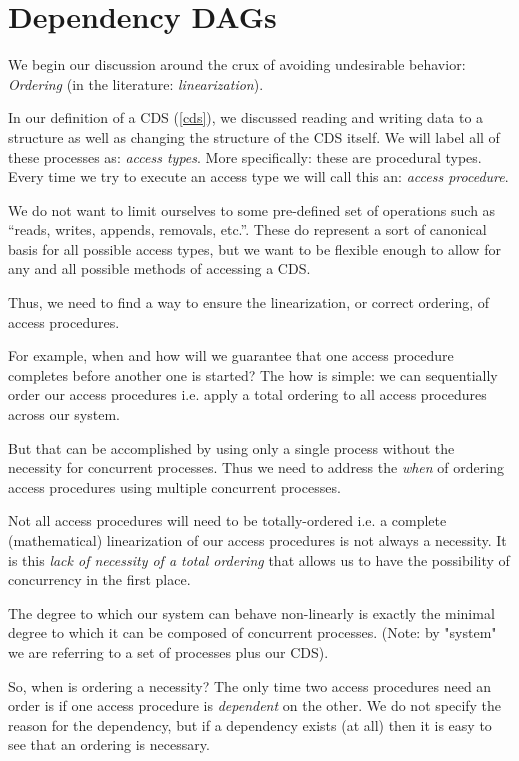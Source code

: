 \section{Dependency DAGs}

We begin our discussion around the crux of avoiding undesirable behavior: \textit{Ordering} (in the literature: \textit{linearization}).

In our definition of a CDS (\ref{cds}), we discussed reading and writing data to a structure as well as changing the structure of the CDS itself. We will label all of these processes as: \textit{access types}. More specifically: these are procedural types. Every time we try to execute an access type we will call this an: \textit{access procedure}.

We do not want to limit ourselves to some pre-defined set of operations such as ``reads, writes, appends, removals, etc.''. These do represent a sort of canonical basis for all possible access types, but we want to be flexible enough to allow for any and all possible methods of accessing a CDS.

Thus, we need to find a way to ensure the linearization, or correct ordering, of access procedures. 

For example, when and how will we guarantee that one access procedure completes before another one is started? The how is simple: we can sequentially order our access procedures i.e. apply a total ordering to all access procedures across our system. 

But that can be accomplished by using only a single process without the necessity for concurrent processes. Thus we need to address the \textit{when} of ordering access procedures using multiple concurrent processes.

Not all access procedures will need to be totally-ordered i.e. a complete (mathematical) linearization of our access procedures is not always a necessity. It is this \textit{lack of necessity of a total ordering} that allows us to have the possibility of concurrency in the first place. 

The degree to which our system can behave non-linearly is exactly the minimal degree to which it can be composed of concurrent processes. (Note: by "system" we are referring to a set of processes plus our CDS).

So, when is ordering a necessity? The only time two access procedures need an order is if one access procedure is \textit{dependent} on the other. We do not specify the reason for the dependency, but if a dependency exists (at all) then it is easy to see that an ordering is necessary.

